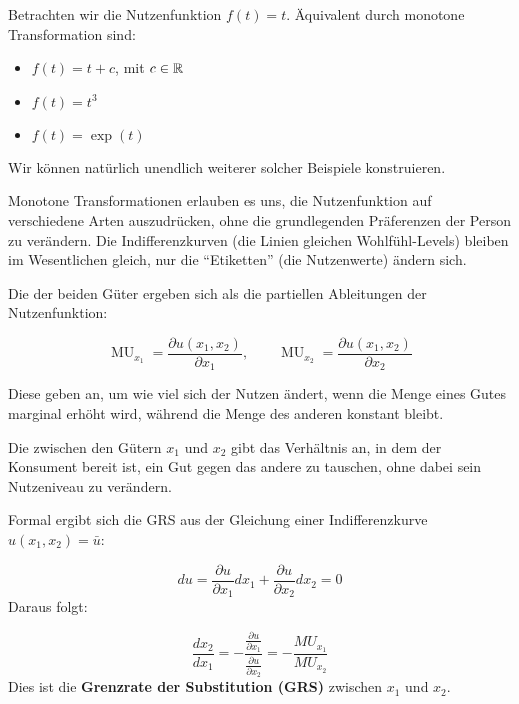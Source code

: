 \begin{example}
	Betrachten wir die Nutzenfunktion $f(t) = t$. Äquivalent durch monotone Transformation sind:
	\begin{itemize}
		\item $f(t) = t+c$, mit $c \in \mathbb{R}$
		\item $f(t) = t^3$
		\item $f(t) = \exp(t)$
	\end{itemize}
	Wir können natürlich unendlich weiterer solcher Beispiele konstruieren.
\end{example}

Monotone Transformationen erlauben es uns, die Nutzenfunktion auf verschiedene Arten auszudrücken, ohne die grundlegenden Präferenzen der Person zu verändern.
Die Indifferenzkurven (die Linien gleichen Wohlfühl-Levels) bleiben im Wesentlichen gleich, nur die \enquote{Etiketten} (die Nutzenwerte) ändern sich.

\begin{definition}
	Die   der beiden Güter ergeben sich als die partiellen Ableitungen der Nutzenfunktion:

	\[
		\operatorname{MU}_{x_1} = \frac{\partial u(x_1, x_2)}{\partial x_1}, \qquad
		\operatorname{MU}_{x_2} = \frac{\partial u(x_1, x_2)}{\partial x_2}
	\]

\end{definition}
Diese geben an, um wie viel sich der Nutzen ändert, wenn die Menge eines Gutes marginal erhöht wird, während die Menge des anderen konstant bleibt.


\begin{definition}
	Die   zwischen den Gütern \( x_1 \) und \( x_2 \) gibt das Verhältnis an, in dem der Konsument bereit ist, ein Gut gegen das andere zu tauschen, ohne dabei sein Nutzeniveau zu verändern.
\end{definition}

Formal ergibt sich die GRS aus der Gleichung einer Indifferenzkurve $u(x_1, x_2) = \bar{u}$:

\[
	du = \frac{\partial u}{\partial x_1} dx_1 + \frac{\partial u}{\partial x_2} dx_2 = 0
\]
Daraus folgt:

\[
	\frac{dx_2}{dx_1} = - \frac{\frac{\partial u}{\partial x_1}}{\frac{\partial u}{\partial x_2}} = - \frac{MU_{x_1}}{MU_{x_2}}
\]
Dies ist die \textbf{Grenzrate der Substitution (GRS)} zwischen \( x_1 \) und \( x_2 \).



